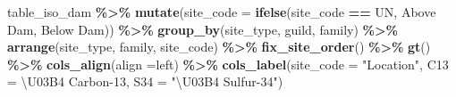 \documentclass[
]{article}
\newenvironment{Shaded}{\begin{snugshade}}{\end{snugshade}}
\newcommand{\AttributeTok}[1]{\textcolor[rgb]{0.13,0.29,0.53}{#1}}
\newcommand{\FunctionTok}[1]{\textcolor[rgb]{0.13,0.29,0.53}{\textbf{#1}}}
\newcommand{\NormalTok}[1]{#1}
\newcommand{\SpecialCharTok}[1]{\textcolor[rgb]{0.81,0.36,0.00}{\textbf{#1}}}
\newcommand{\StringTok}[1]{\textcolor[rgb]{0.31,0.60,0.02}{#1}}
\begin{document}
\begin{Shaded}
\begin{Highlighting}[]
\NormalTok{table\_iso\_dam }\SpecialCharTok{\%\textgreater{}\%}
  \FunctionTok{mutate}\NormalTok{(}\AttributeTok{site\_code =} \FunctionTok{ifelse}\NormalTok{(site\_code }\SpecialCharTok{==} \StringTok{\textquotesingle{}UN\textquotesingle{}}\NormalTok{, }\StringTok{\textquotesingle{}Above Dam\textquotesingle{}}\NormalTok{, }\StringTok{\textquotesingle{}Below Dam\textquotesingle{}}\NormalTok{)) }\SpecialCharTok{\%\textgreater{}\%}
  \FunctionTok{group\_by}\NormalTok{(site\_type, guild, family) }\SpecialCharTok{\%\textgreater{}\%}
  \FunctionTok{arrange}\NormalTok{(site\_type, family, site\_code) }\SpecialCharTok{\%\textgreater{}\%}
  \FunctionTok{fix\_site\_order}\NormalTok{() }\SpecialCharTok{\%\textgreater{}\%}
  \FunctionTok{gt}\NormalTok{() }\SpecialCharTok{\%\textgreater{}\%}
  \FunctionTok{cols\_align}\NormalTok{(}\AttributeTok{align =}\StringTok{\textquotesingle{}left\textquotesingle{}}\NormalTok{) }\SpecialCharTok{\%\textgreater{}\%} 
    \FunctionTok{cols\_label}\NormalTok{(}\AttributeTok{site\_code =} \StringTok{"Location"}\NormalTok{,}
               \AttributeTok{C13 =} \StringTok{\textquotesingle{}\textbackslash{}U03B4 Carbon{-}13\textquotesingle{}}\NormalTok{,}
               \AttributeTok{S34 =} \StringTok{"\textbackslash{}U03B4 Sulfur{-}34"}\NormalTok{)}
\end{Highlighting}
\end{Shaded}
\end{document}
